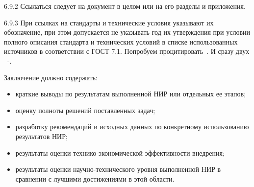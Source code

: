 6.9.2 Ссылаться следует на документ в целом или на его разделы и приложения.

6.9.3 При ссылках на стандарты и технические условия указывают их обозначение,
при этом допускается не указывать год их утверждения при условии полного
описания стандарта и технических условий в списке использованных источников в
соответствии с ГОСТ 7.1.
Попробуем процитировать~\cite{zakas}. И сразу двух
~\cite{deridder}-\cite{antopol}.



Заключение должно содержать:
\begin{itemize}
    \item краткие выводы по результатам выполненной НИР или отдельных ее этапов;
    \item оценку полноты решений поставленных задач;
    \item разработку рекомендаций и исходных данных по конкретному использованию
          результатов НИР;
    \item результаты оценки технико-экономической эффективности внедрения;
    \item результаты оценки научно-технического уровня выполненной НИР в сравнении с
          лучшими достижениями в этой области.
\end{itemize}


\printbib


